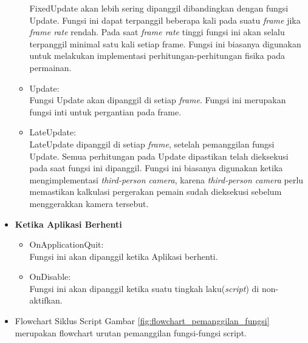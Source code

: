 \begin{itemize}
\begin{itemize}
        FixedUpdate akan lebih sering dipanggil dibandingkan dengan fungsi Update. Fungsi ini dapat terpanggil beberapa kali pada suatu \textit{frame} jika \textit{frame rate} rendah. Pada saat \textit{frame rate} tinggi fungsi ini akan selalu terpanggil minimal satu kali setiap frame. Fungsi ini biasanya digunakan untuk melakukan implementasi perhitungan-perhitungan fisika pada permainan. 
        \item Update:\\
        Fungsi Update akan dipanggil di setiap \textit{frame}. Fungsi ini merupakan fungsi inti untuk pergantian pada frame.
        \item LateUpdate:\\
        LateUpdate dipanggil di setiap \textit{frame}, setelah pemanggilan fungsi Update. Semua perhitungan pada Update dipastikan telah dieksekusi pada saat fungsi ini dipanggil. Fungsi ini biasanya digunakan ketika mengimplementasi \textit{third-person camera}, karena \textit{third-person camera} perlu memastikan kalkulasi pergerakan pemain sudah dieksekusi sebelum menggerakkan kamera tersebut.
    \end{itemize}
    \item \textbf{Ketika Aplikasi Berhenti}
    \begin{itemize}
        \item OnApplicationQuit:\\
        Fungsi ini akan dipanggil ketika Aplikasi berhenti.
        \item OnDisable:\\
        Fungsi ini akan dipanggil ketika suatu tingkah laku(\textit{script}) di non-aktifkan.
    \end{itemize}
    \item Flowchart Siklus Script
    Gambar \ref{fig:flowchart_pemanggilan_fungsi} merupakan flowchart urutan pemanggilan fungsi-fungsi script.
    

\end{itemize}
